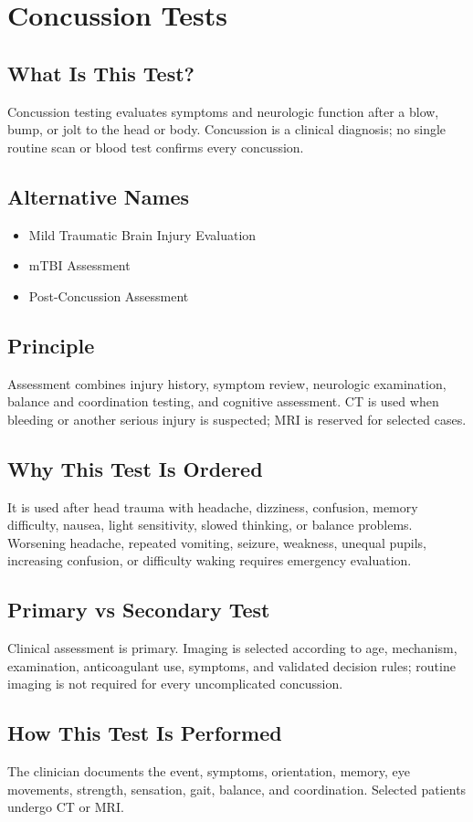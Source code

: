 \chapter{Concussion Tests}
\section*{What Is This Test?}
Concussion testing evaluates symptoms and neurologic function after a blow, bump, or jolt to the head or body. Concussion is a clinical diagnosis; no single routine scan or blood test confirms every concussion.
\section*{Alternative Names}
\begin{itemize}\item Mild Traumatic Brain Injury Evaluation\item mTBI Assessment\item Post-Concussion Assessment\end{itemize}
\section*{Principle}
Assessment combines injury history, symptom review, neurologic examination, balance and coordination testing, and cognitive assessment. CT is used when bleeding or another serious injury is suspected; MRI is reserved for selected cases.
\section*{Why This Test Is Ordered}
It is used after head trauma with headache, dizziness, confusion, memory difficulty, nausea, light sensitivity, slowed thinking, or balance problems. Worsening headache, repeated vomiting, seizure, weakness, unequal pupils, increasing confusion, or difficulty waking requires emergency evaluation.
\section*{Primary vs Secondary Test}
Clinical assessment is primary. Imaging is selected according to age, mechanism, examination, anticoagulant use, symptoms, and validated decision rules; routine imaging is not required for every uncomplicated concussion.
\section*{How This Test Is Performed}
The clinician documents the event, symptoms, orientation, memory, eye movements, strength, sensation, gait, balance, and coordination. Selected patients undergo CT or MRI.
